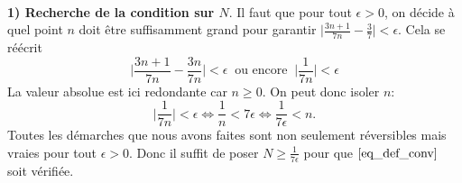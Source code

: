 \documentclass[oneside,11pt,french,table]{book}
\theoremstyle{definition}
\theoremstyle{plain}
\theoremstyle{remark}
\begin{document}
  \paragraph{}
  \textbf{1) Recherche de la condition sur $N$}. Il faut que pour tout $\epsilon>0$, on décide à quel point $n$ doit être suffisamment grand pour garantir $\bigg|\displaystyle\frac{3n+1}{7n}-\frac{3}{7}\bigg|<\epsilon$. Cela se réécrit
  \begin{equation*}
      \bigg|\displaystyle\frac{3n + 1}{7n} - \displaystyle\frac{3n}{7n}\bigg|<\epsilon \ \text{ ou encore } \ \bigg|\displaystyle\frac{1}{7n}\bigg|<\epsilon
  \end{equation*}
 La valeur absolue est ici redondante car $n \geq 0$. On peut donc isoler $n$:
  \begin{equation*}
      \bigg|\displaystyle\frac{1}{7n}\bigg|<\epsilon \iff \dfrac{1}{n} < 7 \epsilon \iff \dfrac{1}{7 \epsilon} < n.
  \end{equation*}
  Toutes les démarches que nous avons faites sont non seulement réversibles mais vraies pour tout $\epsilon>0$. Donc il suffit de poser  $N\geq \displaystyle\frac{1}{7 \epsilon}$ pour que \textcolor{blue}{$\eqref{eq_def_conv}$} soit vérifiée.
\end{document}
